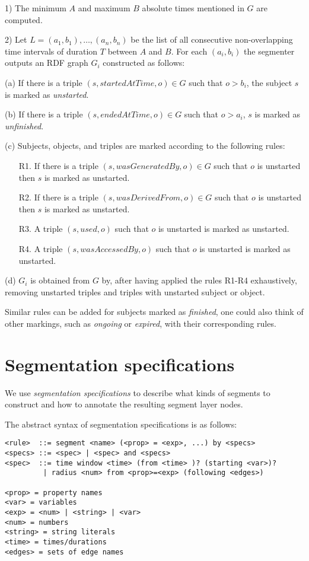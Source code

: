 \documentclass{article}
\begin{document}
1) The minimum $A$ and maximum $B$ absolute times mentioned in $G$ are computed.

2) Let $L = (a_1, b_1), \ldots, (a_n, b_n)$ be the list of all consecutive non-overlapping
time intervals of duration $T$ between $A$ and $B$. For each $(a_i, b_i)$ the segmenter outputs an RDF graph $G_i$ constructed as follows:

(a) If there is a triple $(s, startedAtTime, o)\in G$ such that $o>b_i$, the subject $s$ is marked as {\em unstarted}.

(b) If there is a triple $(s, endedAtTime, o)\in G$ such that $o>a_i$, $s$ is marked as {\em unfinished}.

(c) Subjects, objects, and triples are marked according to the following rules:
\begin{itemize}
\item[R1.] If there is a triple $(s, wasGeneratedBy, o)\in G$ 
such that $o$ is unstarted then $s$ is marked as unstarted.
\item[R2.] If there is a triple $(s, wasDerivedFrom, o)\in G$ 
such that $o$ is unstarted then $s$ is marked as unstarted.
\item[R3.] A triple $(s, used, o)$ such that $o$ is unstarted is marked as unstarted.
\item[R4.] A triple $(s, wasAccessedBy, o)$ such that $o$ is unstarted is marked as unstarted.
\end{itemize}
(d) $G_i$ is obtained from $G$ by, after having applied the rules R1-R4 exhaustively, 
removing unstarted triples and triples with unstarted subject or object.

Similar rules can be added for subjects marked as {\em finished}, one could also think of 
other markings, such as {\em ongoing} or {\em expired}, with their corresponding rules.

\section{Segmentation specifications}

We use \emph{segmentation specifications} to describe what kinds of
segments to construct and how to annotate the resulting segment layer
nodes.

The abstract syntax of segmentation specifications is as follows:
\begin{verbatim}
<rule>  ::= segment <name> (<prop> = <exp>, ...) by <specs>
<specs> ::= <spec> | <spec> and <specs>
<spec>  ::= time window <time> (from <time> )? (starting <var>)?
         | radius <num> from <prop>=<exp> (following <edges>)
         
<prop> = property names
<var> = variables
<exp> = <num> | <string> | <var>
<num> = numbers
<string> = string literals
<time> = times/durations
<edges> = sets of edge names
\end{verbatim}
\end{document}
